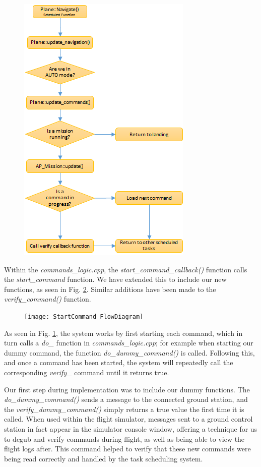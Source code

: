 \begin{figure}[htbp!] 
\centering    
\includegraphics[height=0.9\textheight]{Navigate_FlowDiagram}
\caption[]{}
\label{fig:navigateFlow}
\end{figure}

Within the \textit{commands\_logic.cpp}, the \textit{start\_command\_callback()} function calls the \textit{start\_command} function. We have extended this to include our new functions, as seen in Fig. \ref{fig:startcommand}. Similar additions have been made to the \textit{verify\_command()} function. 

\begin{figure}[htbp!] 
\centering    
\texttt{[image: StartCommand\_FlowDiagram]}
\caption[]{}
\label{fig:startcommand}
\end{figure}

As seen in Fig. \ref{fig:navigateFlow}, the system works by first starting each command, which in turn calls a \textit{do\_} function in \textit{commands\_logic.cpp}; for example when starting our dummy command, the function \textit{do\_dummy\_command()} is called. Following this, and once a command has been started, the system will repeatedly call the corresponding \textit{verify\_} command until it returns true. 

Our first step during implementation was to include our dummy functions. The \textit{do\_dummy\_command()} sends a message to the connected ground station, and the \textit{verify\_dummy\_command()} simply returns a true value the first time it is called. When used within the flight simulator, messages sent to a ground control station in fact appear in the simulator console window, offering a technique for us to degub and verify commands during flight, as well as being able to view the flight logs after. This command helped to verify that these new commands were being read correctly and handled by the task scheduling system. 

